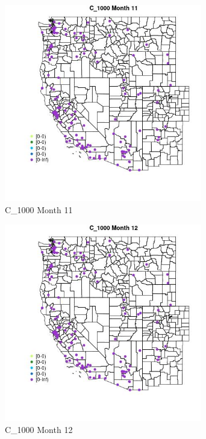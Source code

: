 \begin{figure} 
\centering  
\includegraphics[width=0.77\textwidth]{Code_Outputs/Report_ML_input_PM25_Step4_part_e_de_duplicated_aves_MapObsMo11C_1000.jpg} 
\caption{\label{fig:Report_ML_input_PM25_Step4_part_e_de_duplicated_avesMapObsMo11C_1000}C_1000 Month 11} 
\end{figure} 
 

\begin{figure} 
\centering  
\includegraphics[width=0.77\textwidth]{Code_Outputs/Report_ML_input_PM25_Step4_part_e_de_duplicated_aves_MapObsMo12C_1000.jpg} 
\caption{\label{fig:Report_ML_input_PM25_Step4_part_e_de_duplicated_avesMapObsMo12C_1000}C_1000 Month 12} 
\end{figure} 
 

